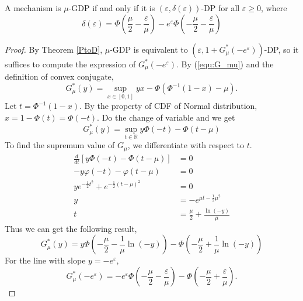 \documentclass{article}
\begin{document}
\begin{corollary}
    A mechanism is $\mu$-GDP if and only if it is $(\varepsilon, \delta(\varepsilon))$-DP for all $\varepsilon \ge 0$, where
    \begin{equation*}
        \delta(\varepsilon) = \Phi\left(\frac{\mu}{2}-\frac{\varepsilon} {\mu}\right) -e^\varepsilon\Phi\left(-\frac{\mu}{2}- \frac{\varepsilon}{\mu}\right)
    \end{equation*}

    \begin{proof}
        By Theorem \ref{PtoD}, $\mu$-GDP is equivalent to $(\varepsilon, 1+ G^*_\mu (-e^\varepsilon))$-DP, so it suffices to compute the expression of $G_\mu^*(-e^\varepsilon)$. By (\ref{equ:G_mu}) and the definition of convex conjugate,
        \begin{equation*}
            G_\mu^*(y) =\sup_{x \in [0,1]}yx - \Phi(\Phi^{-1}(1-x)-\mu).
        \end{equation*}
        Let $t = \Phi^{-1}(1-x)$. By the property of CDF of Normal distribution, $x = 1- \Phi(t) = \Phi(-t)$. Do the change of variable and we get 
        \begin{equation*}
            G^*_\mu (y) = \sup_{t\in \mathbb{R}}y \Phi(-t) - \Phi(t-\mu)
        \end{equation*}
        To find the supremum value of $G_\mu$, we differentiate with respect to $t$.
        \begin{align*}
            \frac{d}{dt}[y\Phi(-t)-\Phi(t-\mu)] &= 0\\
            -y\varphi(-t) - \varphi(t-\mu) &= 0\\
            ye^{-\frac{1}{2}t^2} + e^{-\frac{1}{2}(t-\mu)^2} &= 0\\
            y &= - e^{\mu t - \frac{1}{2}\mu^2}\\
            t &= \frac{\mu}{2} + \frac{\ln(-y)}{\mu}
        \end{align*}
        Thus we can get the following result,
        \begin{equation*}
            G_\mu^*(y) = y \Phi\left(-\frac{\mu}{2}-\frac{1}{\mu}\ln(-y)\right)-\Phi\left(-\frac{\mu}{2} + \frac{1}{\mu}\ln(-y)\right) 
        \end{equation*}
        For the line with slope $y = -e^\varepsilon$,
        \begin{equation*}
            G_\mu ^* (-e^\varepsilon) = -e^\varepsilon\Phi\left(-\frac{\mu}{2}- \frac{\varepsilon}{\mu}\right) - \Phi\left(-\frac{\mu}{2}+\frac{\varepsilon}{\mu}\right).

\end{equation*}
\end{proof}
\end{corollary}
\end{document}
